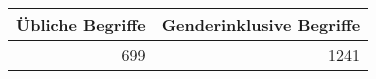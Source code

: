 
\begin{tabular}{rr}
\toprule
Übliche Begriffe & Genderinklusive Begriffe\\
\midrule
699 & 1241\\
\bottomrule
\end{tabular}